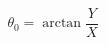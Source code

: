 
\begin{equation} \label{theta_0_eq_final}
\theta_0 = \arctan{\frac{Y}{X}}
\end{equation}













